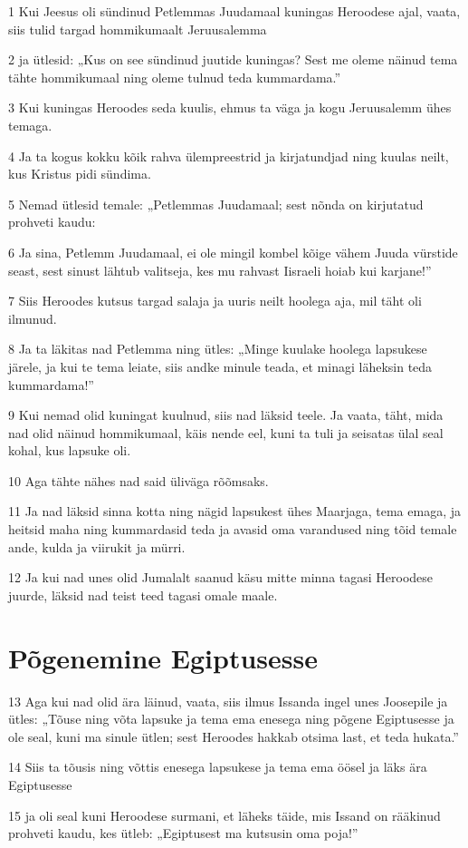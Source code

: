 \par 1 Kui Jeesus oli sündinud Petlemmas Juudamaal kuningas Heroodese ajal, vaata, siis tulid targad hommikumaalt Jeruusalemma
\par 2 ja ütlesid: „Kus on see sündinud juutide kuningas? Sest me oleme näinud tema tähte hommikumaal ning oleme tulnud teda kummardama.”
\par 3 Kui kuningas Heroodes seda kuulis, ehmus ta väga ja kogu Jeruusalemm ühes temaga.
\par 4 Ja ta kogus kokku kõik rahva ülempreestrid ja kirjatundjad ning kuulas neilt, kus Kristus pidi sündima.
\par 5 Nemad ütlesid temale: „Petlemmas Juudamaal; sest nõnda on kirjutatud prohveti kaudu:
\par 6 Ja sina, Petlemm Juudamaal, ei ole mingil kombel kõige vähem Juuda vürstide seast, sest sinust lähtub valitseja, kes mu rahvast Iisraeli hoiab kui karjane!”
\par 7 Siis Heroodes kutsus targad salaja ja uuris neilt hoolega aja, mil täht oli ilmunud.
\par 8 Ja ta läkitas nad Petlemma ning ütles: „Minge kuulake hoolega lapsukese järele, ja kui te tema leiate, siis andke minule teada, et minagi läheksin teda kummardama!”
\par 9 Kui nemad olid kuningat kuulnud, siis nad läksid teele. Ja vaata, täht, mida nad olid näinud hommikumaal, käis nende eel, kuni ta tuli ja seisatas ülal seal kohal, kus lapsuke oli.
\par 10 Aga tähte nähes nad said üliväga rõõmsaks.
\par 11 Ja nad läksid sinna kotta ning nägid lapsukest ühes Maarjaga, tema emaga, ja heitsid maha ning kummardasid teda ja avasid oma varandused ning tõid temale ande, kulda ja viirukit ja mürri.
\par 12 Ja kui nad unes olid Jumalalt saanud käsu mitte minna tagasi Heroodese juurde, läksid nad teist teed tagasi omale maale.

\section*{Põgenemine Egiptusesse}

\par 13 Aga kui nad olid ära läinud, vaata, siis ilmus Issanda ingel unes Joosepile ja ütles: „Tõuse ning võta lapsuke ja tema ema enesega ning põgene Egiptusesse ja ole seal, kuni ma sinule ütlen; sest Heroodes hakkab otsima last, et teda hukata.”
\par 14 Siis ta tõusis ning võttis enesega lapsukese ja tema ema öösel ja läks ära Egiptusesse
\par 15 ja oli seal kuni Heroodese surmani, et läheks täide, mis Issand on rääkinud prohveti kaudu, kes ütleb: „Egiptusest ma kutsusin oma poja!”

